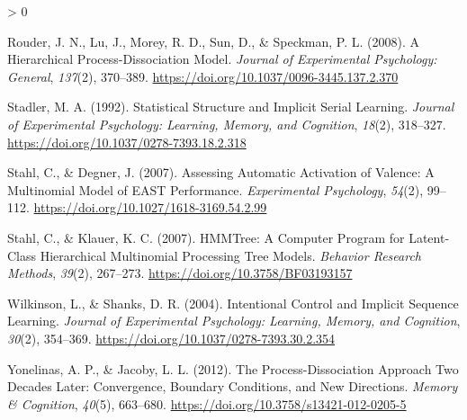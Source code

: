 \documentclass[
  english,
  man]{apa6}
\newlength{\cslhangindent}
\newenvironment{CSLReferences}[2] %
 {%
  \setlength{\parindent}{0pt}
  \ifodd #1 \everypar{\setlength{\hangindent}{\cslhangindent}}\ignorespaces\fi
  \ifnum #2 > 0
  \setlength{\parskip}{#2\baselineskip}
  \fi
 }%
 {}
\begin{document}
\begin{CSLReferences}{1}{0}
\leavevmode\hypertarget{ref-rouder_hierarchical_2008}{}%
Rouder, J. N., Lu, J., Morey, R. D., Sun, D., \& Speckman, P. L. (2008). A {Hierarchical Process}-{Dissociation Model}. \emph{Journal of Experimental Psychology: General}, \emph{137}(2), 370--389. \url{https://doi.org/10.1037/0096-3445.137.2.370}

\leavevmode\hypertarget{ref-stadler_statistical_1992}{}%
Stadler, M. A. (1992). Statistical {Structure} and {Implicit Serial Learning}. \emph{Journal of Experimental Psychology: Learning, Memory, and Cognition}, \emph{18}(2), 318--327. \url{https://doi.org/10.1037/0278-7393.18.2.318}

\leavevmode\hypertarget{ref-stahl_assessing_2007}{}%
Stahl, C., \& Degner, J. (2007). Assessing {Automatic Activation} of {Valence}: {A Multinomial Model} of {EAST Performance}. \emph{Experimental Psychology}, \emph{54}(2), 99--112. \url{https://doi.org/10.1027/1618-3169.54.2.99}

\leavevmode\hypertarget{ref-stahl_hmmtree_2007}{}%
Stahl, C., \& Klauer, K. C. (2007). {HMMTree}: {A Computer Program} for {Latent}-{Class Hierarchical Multinomial Processing Tree Models}. \emph{Behavior Research Methods}, \emph{39}(2), 267--273. \url{https://doi.org/10.3758/BF03193157}

\leavevmode\hypertarget{ref-wilkinson_intentional_2004}{}%
Wilkinson, L., \& Shanks, D. R. (2004). Intentional {Control} and {Implicit Sequence Learning}. \emph{Journal of Experimental Psychology: Learning, Memory, and Cognition}, \emph{30}(2), 354--369. \url{https://doi.org/10.1037/0278-7393.30.2.354}

\leavevmode\hypertarget{ref-yonelinas_processdissociation_2012}{}%
Yonelinas, A. P., \& Jacoby, L. L. (2012). The {Process}-{Dissociation Approach Two Decades Later}: {Convergence}, {Boundary Conditions}, and {New Directions}. \emph{Memory \& Cognition}, \emph{40}(5), 663--680. \url{https://doi.org/10.3758/s13421-012-0205-5}

\end{CSLReferences}

\endgroup


\clearpage
\makeatletter
\efloat@restorefloats
\makeatother
\end{document}
